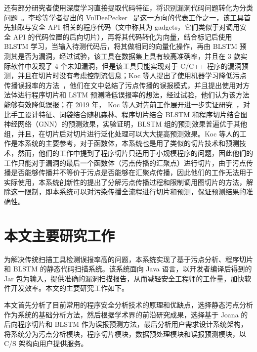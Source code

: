 还有部分研究者使用深度学习直接提取代码特征，将识别漏洞代码问题转化为分类问题~\cite{vuldeepecker,Koc2017,Koc2019}。李珍等学者提出的 VulDeePecker~\cite{vuldeepecker} 是这一方向的代表工作之一，该工具首先抽取与安全 API 相关的程序代码（文中称其为 gadgets，它们类似于对调用安全 API 的代码位置的后向切片），再将其代码转化为向量，结合标记后使用 BLSTM 学习，当输入待测代码后，将其做相同的向量化操作，再由 BLSTM 预测其是否为漏洞，经过试验，该工具在数据集上具有较高准确率，并且在 3 款实际软件中发现了 4 个未知漏洞，但是该工具只能实现对于 C/C++ 程序的漏洞预测，并且在切片时没有考虑控制流信息；Koc 等人提出了使用机器学习降低污点传播误报率的方法~\cite{Koc2017}，他们在文中总结了污点传播的误报模式，并且提出使用对方法体进行程序切片和 LSTM 预测降低误报率的想法，经过试验，他们认为该方法能够有效降低误报；在 2019 年， Koc 等人对先前工作展开进一步实证研究~\cite{Koc2019}，对比手工设计特征、词袋结合随机森林、程序切片结合 BLSTM 和程序切片结合图神经网络（GNN）的预测效果，实验证明，BLSTM 组的预测效果普遍优于其他组，并且，在切片后对切片进行泛化处理可以大大提高预测效果。Koc 等人的工作是本系统的主要参考，对于函数体，本系统也是用了类似的切片技术和预测技术，然而，他们的工作中提到了程序切片只适用于小规模程序的问题，因此他们的工作只能对于漏洞的最后一个函数体（污点传播的汇聚点）进行切片，由于污点传播是否能够传播并不等价于污点是否能够在汇聚点传播，因此他们的工作无法用于实际使用，本系统创新性的提出了分解污点传播过程和限制调用图切片的方法，解除这一限制，即本系统可以对污染传播全流程进行切片和预测，保证预测结果的准确性。



\section{本文主要研究工作}
为解决传统扫描工具检测误报率高的问题，本系统实现了基于污点分析、程序切片和 BLSTM 的静态代码扫描系统。该系统面向 Java 语言，以开发者编译后得到的 Jar 包为输入，提供准确的漏洞扫描报告，从而减轻安全工程师的工作量，加快软件开发效率。本文的主要研究工作如下。

本文首先分析了目前常用的程序安全分析技术的原理和优缺点，选择静态污点分析作为系统的基础分析方法，然后根据学术界的前沿研究成果，选择基于 Joana 的后向程序切片和 BLSTM 作为误报预测方法，最后分析用户需求设计系统架构，将系统分为污点分析模块，程序切片模块，数据预处理模块和误报预测模块，以 C/S 架构向用户提供服务。

